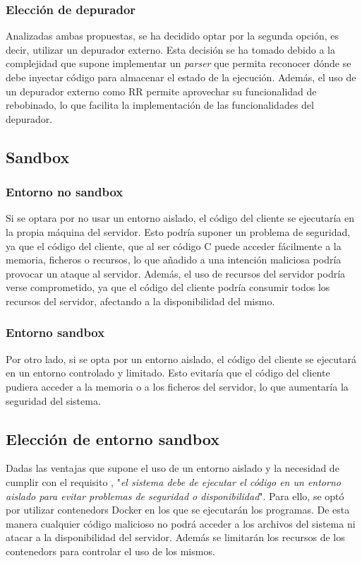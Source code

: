 \subsubsection{Elección de depurador} \label{subsec:eleccion-depurador}

Analizadas ambas propuestas, se ha decidido optar por la segunda opción, es decir, utilizar un \gls{depurador} externo. Esta decisión se ha tomado debido a la complejidad que supone implementar un \textit{\gls{parser}} que permita reconocer dónde se debe inyectar código para almacenar el estado de la ejecución. Además, el uso de un \gls{depurador} externo como RR permite aprovechar su funcionalidad de rebobinado, lo que facilita la implementación de las funcionalidades del depurador.

\subsection{Sandbox} \label{subsec:sandbox}

\subsubsection{Entorno no sandbox} \label{subsubsec:entorno-no-sandbox}
Si se optara por no usar un entorno aislado, el código del cliente se ejecutaría en la propia máquina del servidor. Esto podría suponer un problema de seguridad, ya que el código del cliente, que al ser código C puede acceder fácilmente a la memoria, ficheros o recursos, lo que añadido a una intención maliciosa podría provocar un ataque al servidor. Además, el uso de recursos del servidor podría verse comprometido, ya que el código del cliente podría consumir todos los recursos del servidor, afectando a la disponibilidad del mismo.

\subsubsection{Entorno sandbox} \label{subsubsec:entorno-sandbox}
Por otro lado, si se opta por un entorno aislado, el código del cliente se ejecutará en un entorno controlado y limitado. Esto evitaría que el código del cliente pudiera acceder a la memoria o a los ficheros del servidor, lo que aumentaría la seguridad del sistema. 

\subsection{Elección de entorno sandbox} \label{subsec:eleccion-sandbox}
Dadas las ventajas que supone el uso de un entorno aislado y la necesidad de cumplir con  el requisito , "\textit{el sistema debe de ejecutar el código en un entorno aislado para evitar problemas de seguridad o disponibilidad}". Para ello, se optó por utilizar \glspl{contenedor} Docker en los que se ejecutarán los programas. De esta manera cualquier código malicioso no podrá acceder a los archivos del sistema ni atacar a la disponibilidad del servidor. Además se limitarán los recursos de los \glspl{contenedor} para controlar el uso de los mismos.


